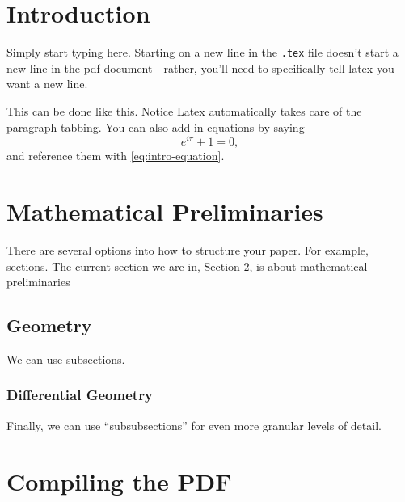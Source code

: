 


%
%

\section{Introduction}

Simply start typing here.
Starting on a new line in the \verb+.tex+ file doesn't start a new line in the pdf document - rather, you'll need to specifically tell latex you want a new line.
\bigskip

This can be done like this.
Notice Latex automatically takes care of the paragraph tabbing.
You can also add in equations by saying
\begin{equation} \label{eq:intro-equation}
	e^{i\pi} + 1 = 0,
\end{equation}
and reference them with \eqref{eq:intro-equation}.



%
%

\section{Mathematical Preliminaries} \label{sec:math-prelims}

There are several options into how to structure your paper.
For example, sections.
The current section we are in, Section \ref{sec:math-prelims}, is about mathematical preliminaries



%
%

\subsection{Geometry}

We can use subsections.



%
%

\subsubsection{Differential Geometry}

Finally, we can use ``subsubsections'' for even more granular levels of detail.



%
%

\section{Compiling the PDF}


